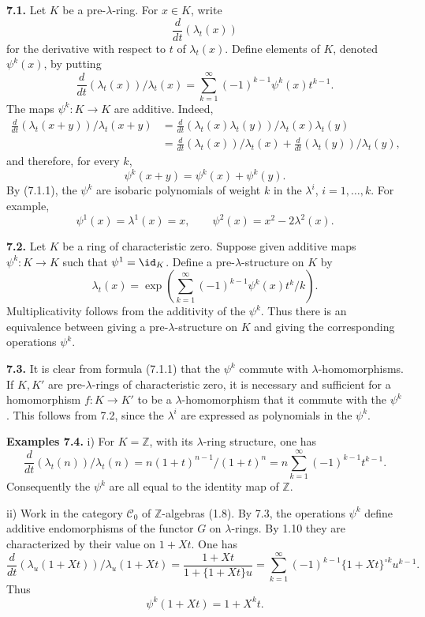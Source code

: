 \textbf{7.1.} Let \(K\) be a pre-\(\lambda\)-ring. For \(x\in K\), write
\[
  \frac{d}{dt}(\lambda_t(x))
\]
for the derivative with respect to \(t\) of \(\lambda_t(x)\). Define elements of \(K\), denoted \(\psi^k(x)\), by putting
\begin{equation}\tag{7.1.1}
  \frac{d}{dt}(\lambda_t(x))/\lambda_t(x)
  =
  \sum_{k=1}^{\infty}(-1)^{k-1}\psi^k(x)t^{k-1}.
\end{equation}
The maps \(\psi^k:K\to K\) are additive. Indeed,
\[
\begin{aligned}
 \frac{d}{dt}(\lambda_t(x+y))/\lambda_t(x+y)
 &=
 \frac{d}{dt}(\lambda_t(x)\lambda_t(y))/\lambda_t(x)\lambda_t(y)\\
 &=
 \frac{d}{dt}(\lambda_t(x))/\lambda_t(x)
 +\frac{d}{dt}(\lambda_t(y))/\lambda_t(y),
\end{aligned}
\]
and therefore, for every \(k\),
\[
  \psi^k(x+y)=\psi^k(x)+\psi^k(y).
\]
By (7.1.1), the \(\psi^k\) are isobaric polynomials of weight \(k\) in the \(\lambda^i\), \(i=1,\ldots,k\). For example,
\[
  \psi^1(x)=\lambda^1(x)=x,
  \qquad
  \psi^2(x)=x^2-2\lambda^2(x).
\]

\textbf{7.2.} Let \(K\) be a ring of characteristic zero. Suppose given additive maps \(\psi^k:K\to K\) such that \(\psi^1=\id_K\). Define a pre-\(\lambda\)-structure on \(K\) by
\begin{equation}\tag{7.2.1}
  \lambda_t(x)=
  \exp\left(\sum_{k=1}^{\infty}(-1)^{k-1}\psi^k(x)t^k/k\right).
\end{equation}
Multiplicativity follows from the additivity of the \(\psi^k\). Thus there is an equivalence between giving a pre-\(\lambda\)-structure on \(K\) and giving the corresponding operations \(\psi^k\).

\textbf{7.3.} It is clear from formula (7.1.1) that the \(\psi^k\) commute with \(\lambda\)-homomorphisms. If \(K,K'\) are pre-\(\lambda\)-rings of characteristic zero, it is necessary and sufficient for a homomorphism \(f:K\to K'\) to be a \(\lambda\)-homomorphism that it commute with the \(\psi^k\). This follows from 7.2, since the \(\lambda^i\) are expressed as polynomials in the \(\psi^k\).

\textbf{Examples 7.4.} i) For \(K=\mathbb Z\), with its \(\lambda\)-ring structure, one has
\[
  \frac{d}{dt}(\lambda_t(n))/\lambda_t(n)
  =
  n(1+t)^{n-1}/(1+t)^n
  =
  n\sum_{k=1}^{\infty}(-1)^{k-1}t^{k-1}.
\]
Consequently the \(\psi^k\) are all equal to the identity map of \(\mathbb Z\).

ii) Work in the category \(\mathscr C_0\) of \(\mathbb Z\)-algebras (1.8). By 7.3, the operations \(\psi^k\) define additive endomorphisms of the functor \(G\) on \(\lambda\)-rings. By 1.10 they are characterized by their value on \(1+Xt\). One has
\[
  \frac{d}{dt}(\lambda_u(1+Xt))/\lambda_u(1+Xt)
  =
  \frac{1+Xt}{1+\{1+Xt\}u}
  =
  \sum_{k=1}^{\infty}(-1)^{k-1}\{1+Xt\}^{\circ k}u^{k-1}.
\]
Thus
\begin{equation}\tag{7.4.1}
  \psi^k(1+Xt)=1+X^k t.
\end{equation}

